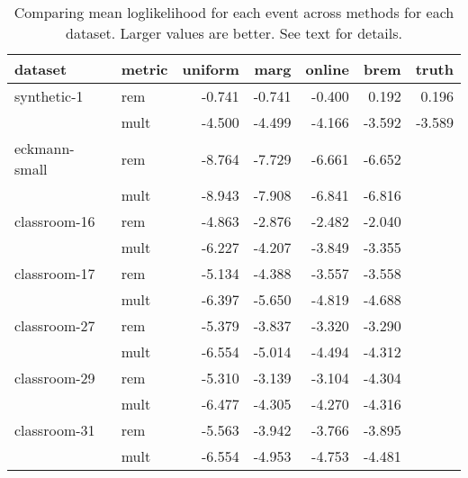 \begin{table}[t]
\begin{center}
{\footnotesize
\begin{tabular}{llrrrrr}
  \hline
dataset & metric & uniform & marg & online & brem & truth \\ 
  \hline
synthetic-1 & rem & -0.741 & -0.741 & -0.400 & 0.192 & 0.196 \\ 
   & mult & -4.500 & -4.499 & -4.166 & -3.592 & -3.589 \\ 
  eckmann-small & rem & -8.764 & -7.729 & -6.661 & -6.652 &  \\ 
   & mult & -8.943 & -7.908 & -6.841 & -6.816 &  \\ 
  classroom-16 & rem & -4.863 & -2.876 & -2.482 & -2.040 &  \\ 
   & mult & -6.227 & -4.207 & -3.849 & -3.355 &  \\ 
  classroom-17 & rem & -5.134 & -4.388 & -3.557 & -3.558 &  \\ 
   & mult & -6.397 & -5.650 & -4.819 & -4.688 &  \\ 
  classroom-27 & rem & -5.379 & -3.837 & -3.320 & -3.290 &  \\ 
   & mult & -6.554 & -5.014 & -4.494 & -4.312 &  \\ 
  classroom-29 & rem & -5.310 & -3.139 & -3.104 & -4.304 &  \\ 
   & mult & -6.477 & -4.305 & -4.270 & -4.316 &  \\ 
  classroom-31 & rem & -5.563 & -3.942 & -3.766 & -3.895 &  \\ 
   & mult & -6.554 & -4.953 & -4.753 & -4.481 &  \\ 
   \hline
\end{tabular}
}
\caption{Comparing mean loglikelihood for each event across methods for each dataset.  Larger values are better.  See text for details.}
\label{tab:results}
\end{center}
\end{table}
